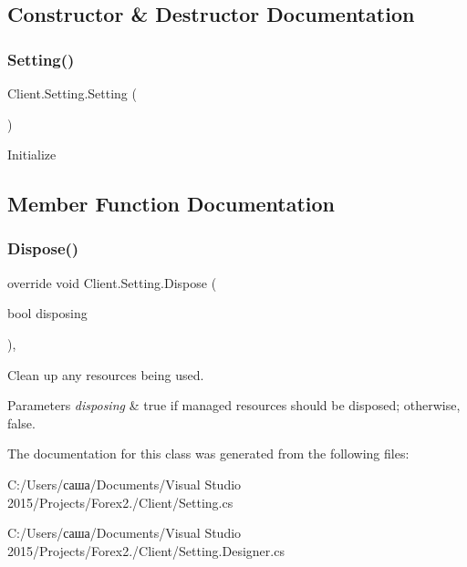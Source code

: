 \subsection{Constructor \& Destructor Documentation}
\hypertarget{class_client_1_1_setting_a733582576c54cf20fd2437cd1240a97c}{}\label{class_client_1_1_setting_a733582576c54cf20fd2437cd1240a97c} 
\subsubsection{\texorpdfstring{Setting()}{Setting()}}
{\footnotesize\ttfamily Client.\+Setting.\+Setting (\begin{DoxyParamCaption}{ }\end{DoxyParamCaption})\hspace{0.3cm}{\ttfamily [inline]}}



Initialize 



\subsection{Member Function Documentation}
\hypertarget{class_client_1_1_setting_abcc5beb1a34b3f8076237e7d4bca5b29}{}\label{class_client_1_1_setting_abcc5beb1a34b3f8076237e7d4bca5b29} 
\subsubsection{\texorpdfstring{Dispose()}{Dispose()}}
{\footnotesize\ttfamily override void Client.\+Setting.\+Dispose (\begin{DoxyParamCaption}\item[{bool}]{disposing }\end{DoxyParamCaption})\hspace{0.3cm}{\ttfamily [inline]}, {\ttfamily [protected]}}



Clean up any resources being used. 


\begin{DoxyParams}{Parameters}
{\em disposing} & true if managed resources should be disposed; otherwise, false.\\
\hline
\end{DoxyParams}


The documentation for this class was generated from the following files\+:\begin{DoxyCompactItemize}
\item 
C\+:/\+Users/саша/\+Documents/\+Visual Studio 2015/\+Projects/\+Forex2./\+Client/Setting.\+cs\item 
C\+:/\+Users/саша/\+Documents/\+Visual Studio 2015/\+Projects/\+Forex2./\+Client/Setting.\+Designer.\+cs\end{DoxyCompactItemize}
